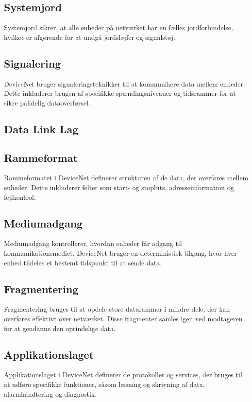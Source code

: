 \subsection{Systemjord}
Systemjord sikrer, at alle enheder på netværket har en fælles jordforbindelse, hvilket er afgørende for at undgå jordsløjfer og signalstøj.

\subsection{Signalering}
DeviceNet bruger signaleringsteknikker til at kommunikere data mellem enheder. Dette inkluderer brugen af specifikke spændingsniveauer og tidsrammer for at sikre pålidelig dataoverførsel.

\subsection{Data Link Lag}	
\subsection*{Rammeformat}
Rammeformatet i DeviceNet definerer strukturen af de data, der overføres mellem enheder. Dette inkluderer felter som start- og stopbits, adresseinformation og fejlkontrol.

\subsection*{Mediumadgang}
Mediumadgang kontrollerer, hvordan enheder får adgang til kommunikationsmediet. DeviceNet bruger en deterministisk tilgang, hvor hver enhed tildeles et bestemt tidspunkt til at sende data.

\subsection*{Fragmentering}
Fragmentering bruges til at opdele store datarammer i mindre dele, der kan overføres effektivt over netværket. Disse fragmenter samles igen ved modtageren for at gendanne den oprindelige data.

\subsection{Applikationslaget}
Applikationslaget i DeviceNet definerer de protokoller og services, der bruges til at udføre specifikke funktioner, såsom læsning og skrivning af data, alarmhåndtering og diagnostik.

